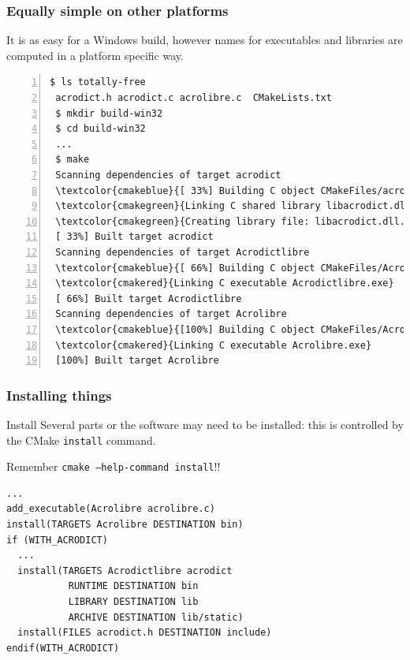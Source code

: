 \documentclass[compress,slidestop,table
              ]
               {beamer}
\newcommand{\fname}[1]{\texttt{#1}}
\begin{document}
\begin{frame}[fragile]
\frametitle{Equally simple on other platforms}
It is as easy for a Windows build, however
names for executables and libraries are computed
in a
\textcolor{cmakeblue}{platform}
\textcolor{cmakered}{specific}
\textcolor{cmakegreen}{way}.
\begin{center}
\begin{Verbatim}[commandchars=\\\{\},fontsize=\tiny,numbers=left,frame=topline,label=CMake + MinGW Makefile]
 $ ls totally-free
 acrodict.h acrodict.c acrolibre.c  CMakeLists.txt
 $ mkdir build-win32
 $ cd build-win32
 ...
 $ make
 Scanning dependencies of target acrodict
 \textcolor{cmakeblue}{[ 33%] Building C object CMakeFiles/acrodict.dir/acrodict.c.obj}
 \textcolor{cmakegreen}{Linking C shared library libacrodict.dll}
 \textcolor{cmakegreen}{Creating library file: libacrodict.dll.a}
 [ 33%] Built target acrodict
 Scanning dependencies of target Acrodictlibre
 \textcolor{cmakeblue}{[ 66%] Building C object CMakeFiles/Acrodictlibre.dir/acrolibre.c.obj}
 \textcolor{cmakered}{Linking C executable Acrodictlibre.exe}
 [ 66%] Built target Acrodictlibre
 Scanning dependencies of target Acrolibre
 \textcolor{cmakeblue}{[100%] Building C object CMakeFiles/Acrolibre.dir/acrolibre.c.obj}
 \textcolor{cmakered}{Linking C executable Acrolibre.exe}
 [100%] Built target Acrolibre
\end{Verbatim}
\end{center}
\end{frame}

\begin{frame}[fragile]
\frametitle{Installing things}
\begin{block}{Install}
Several parts or the software may need to be installed:
this is controlled by the CMake \lstinline!install! command.

\alert{Remember \fname{cmake --help-command install}!!}
\end{block}
\begin{lstlisting}[basicstyle=\tiny,caption=install command examples]
...
add_executable(Acrolibre acrolibre.c)
install(TARGETS Acrolibre DESTINATION bin)
if (WITH_ACRODICT)
  ...
  install(TARGETS Acrodictlibre acrodict
           RUNTIME DESTINATION bin
           LIBRARY DESTINATION lib
           ARCHIVE DESTINATION lib/static)
  install(FILES acrodict.h DESTINATION include)
endif(WITH_ACRODICT)
\end{lstlisting}
\end{frame}
\end{document}
